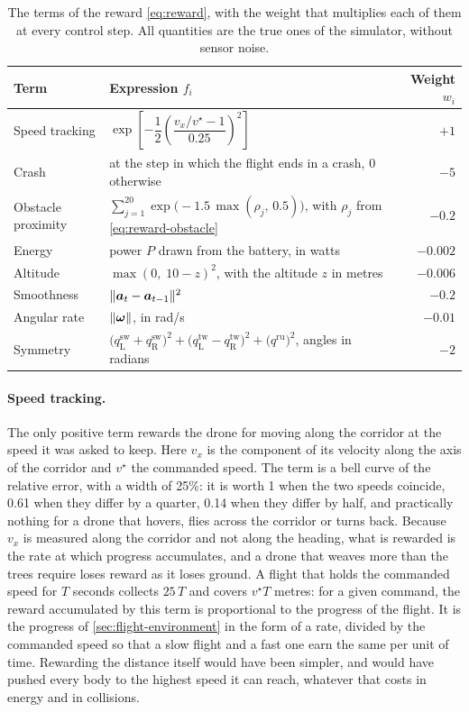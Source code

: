 \begin{table}[htbp]
\centering
\begin{tabularx}{\textwidth}{>{\raggedright\arraybackslash}p{3.1cm} >{\raggedright\arraybackslash}X r}
\hline
Term & Expression $f_i$ & Weight $w_i$ \\
\hline
Speed tracking & $\exp\!\left[-\dfrac{1}{2}\left(\dfrac{v_x / v^{\star} - 1}{0.25}\right)^{2}\right]$ & $+1$ \\
Crash & 1 at the step in which the flight ends in a crash, 0 otherwise & $-5$ \\
Obstacle proximity & $\sum_{j=1}^{20} \exp\!\big(-1.5\, \max(\rho_j,\, 0.5)\big)$, with $\rho_j$ from \eqref{eq:reward-obstacle} & $-0.2$ \\
Energy & power $P$ drawn from the battery, in watts & $-0.002$ \\
Altitude & $\max(0,\; 10 - z)^2$, with the altitude $z$ in metres & $-0.006$ \\
Smoothness & $\lVert \bm{a}_t - \bm{a}_{t-1} \rVert^2$ & $-0.2$ \\
Angular rate & $\lVert \bm{\omega} \rVert$, in rad/s & $-0.01$ \\
Symmetry & $\big(q^{\mathrm{sw}}_{\mathrm{L}} + q^{\mathrm{sw}}_{\mathrm{R}}\big)^2 + \big(q^{\mathrm{tw}}_{\mathrm{L}} - q^{\mathrm{tw}}_{\mathrm{R}}\big)^2 + \big(q^{\mathrm{ru}}\big)^2$, angles in radians & $-2$ \\
\hline
\end{tabularx}
\caption[The terms of the reward]{The terms of the reward \eqref{eq:reward}, with the weight that multiplies each of them at every control step. All quantities are the true ones of the simulator, without sensor noise.}
\label{tab:reward-terms}
\end{table}

\paragraph{Speed tracking.} The only positive term rewards the drone for moving along the corridor at the speed it was asked to keep. Here $v_x$ is the component of its velocity along the axis of the corridor and $v^{\star}$ the commanded speed. The term is a bell curve of the relative error, with a width of 25\%: it is worth 1 when the two speeds coincide, 0.61 when they differ by a quarter, 0.14 when they differ by half, and practically nothing for a drone that hovers, flies across the corridor or turns back. Because $v_x$ is measured along the corridor and not along the heading, what is rewarded is the rate at which progress accumulates, and a drone that weaves more than the trees require loses reward as it loses ground. A flight that holds the commanded speed for $T$ seconds collects $25\,T$ and covers $v^{\star} T$ metres: for a given command, the reward accumulated by this term is proportional to the progress of the flight. It is the progress of \autoref{sec:flight-environment} in the form of a rate, divided by the commanded speed so that a slow flight and a fast one earn the same per unit of time. Rewarding the distance itself would have been simpler, and would have pushed every body to the highest speed it can reach, whatever that costs in energy and in collisions.

